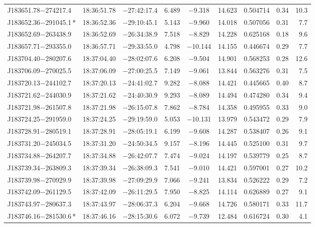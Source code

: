 \begin{table*}
\begin{tabular}{lcccccccr}
J183651.78$-$274217.4 & 18:36:51.78 & $-$27:42:17.4 &  6.489 & $-$9.318 & 14.623 & 0.504714 & 0.34 & 10.3 \\
J183652.36$-$291045.1\,* & 18:36:52.36 & $-$29:10:45.1 &  5.143 & $-$9.960 & 14.018 & 0.507056 & 0.31 & 7.7 \\
J183652.69$-$263438.9 & 18:36:52.69 & $-$26:34:38.9 &  7.518 & $-$8.829 & 14.228 & 0.625168 & 0.18 & 9.6 \\
J183657.71$-$293355.0 & 18:36:57.71 & $-$29:33:55.0 &  4.798 & $-$10.144 & 14.155 & 0.446674 & 0.29 & 7.7 \\
J183704.40$-$280207.6 & 18:37:04.40 & $-$28:02:07.6 &  6.208 & $-$9.504 & 14.901 & 0.568253 & 0.28 & 12.6 \\
J183706.09$-$270025.5 & 18:37:06.09 & $-$27:00:25.5 &  7.149 & $-$9.061 & 13.844 & 0.563276 & 0.31 & 7.5 \\
J183720.13$-$244102.7 & 18:37:20.13 & $-$24:41:02.7 &  9.282 & $-$8.088 & 14.421 & 0.445665 & 0.40 & 8.7 \\
J183721.62$-$244030.9 & 18:37:21.62 & $-$24:40:30.9 &  9.293 & $-$8.089 & 14.494 & 0.474280 & 0.34 & 9.4 \\
J183721.98$-$261507.8 & 18:37:21.98 & $-$26:15:07.8 &  7.862 & $-$8.784 & 14.358 & 0.495955 & 0.33 & 9.0 \\
J183724.25$-$291959.0 & 18:37:24.25 & $-$29:19:59.0 &  5.053 & $-$10.131 & 13.979 & 0.543472 & 0.29 & 7.9 \\
J183728.91$-$280519.1 & 18:37:28.91 & $-$28:05:19.1 &  6.199 & $-$9.608 & 14.287 & 0.538407 & 0.26 & 9.1 \\
J183731.20$-$245034.5 & 18:37:31.20 & $-$24:50:34.5 &  9.157 & $-$8.196 & 14.445 & 0.525100 & 0.31 & 9.7 \\
J183734.88$-$264207.7 & 18:37:34.88 & $-$26:42:07.7 &  7.474 & $-$9.024 & 14.197 & 0.539779 & 0.25 & 8.7 \\
J183739.34$-$263809.3 & 18:37:39.34 & $-$26:38:09.3 &  7.541 & $-$9.010 & 14.421 & 0.597001 & 0.27 & 10.2 \\
J183739.98$-$270929.9 & 18:37:39.98 & $-$27:09:29.9 &  7.066 & $-$9.241 & 13.834 & 0.526222 & 0.29 & 7.2 \\
J183742.09$-$261129.5 & 18:37:42.09 & $-$26:11:29.5 &  7.950 & $-$8.825 & 14.114 & 0.626889 & 0.27 & 9.1 \\
J183743.97$-$280637.3 & 18:37:43.97 & $-$28:06:37.3 &  6.204 & $-$9.668 & 14.726 & 0.580171 & 0.33 & 11.7 \\
J183746.16$-$281530.6\,* & 18:37:46.16 & $-$28:15:30.6 &  6.072 & $-$9.739 & 12.484 & 0.616724 & 0.30 & 4.1 \\

\end{tabular}
\end{table*}
